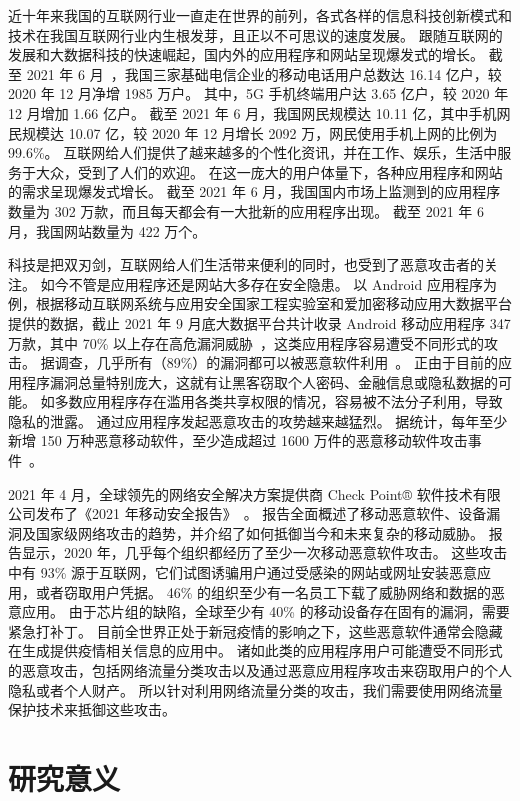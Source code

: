 \documentclass[degree=master,cjk-font=noto]{thuthesis}
\begin{document}
近十年来我国的互联网行业一直走在世界的前列，各式各样的信息科技创新模式和技术在我国互联网行业内生根发芽，且正以不可思议的速度发展。
跟随互联网的发展和大数据科技的快速崛起，国内外的应用程序和网站呈现爆发式的增长。
截至 2021 年 6 月~\cite{CNNIC-report}，我国三家基础电信企业的移动电话用户总数达 16.14 亿户，较 2020 年 12 月净增 1985 万户。
其中，5G 手机终端用户达 3.65 亿户，较 2020 年 12 月增加 1.66 亿户。
截至 2021 年 6 月，我国网民规模达 10.11 亿，其中手机网民规模达 10.07 亿，较 2020 年 12 月增长 2092 万，网民使用手机上网的比例为 99.6\%。
互联网给人们提供了越来越多的个性化资讯，并在工作、娱乐，生活中服务于大众，受到了人们的欢迎。
在这一庞大的用户体量下，各种应用程序和网站的需求呈现爆发式增长。
截至 2021 年 6 月，我国国内市场上监测到的应用程序数量为 302 万款，而且每天都会有一大批新的应用程序出现。
截至 2021 年 6 月，我国网站数量为 422 万个。

科技是把双刃剑，互联网给人们生活带来便利的同时，也受到了恶意攻击者的关注。
如今不管是应用程序还是网站大多存在安全隐患。
以 Android 应用程序为例，根据移动互联网系统与应用安全国家工程实验室和爱加密移动应用大数据平台提供的数据，截止 2021 年 9 月底大数据平台共计收录 Android 移动应用程序 347 万款，其中 70\% 以上存在高危漏洞威胁~\cite{App-report}，这类应用程序容易遭受不同形式的攻击。
据调查，几乎所有（89\%）的漏洞都可以被恶意软件利用~\cite{ZOL-report}。
正由于目前的应用程序漏洞总量特别庞大，这就有让黑客窃取个人密码、金融信息或隐私数据的可能。
如多数应用程序存在滥用各类共享权限的情况，容易被不法分子利用，导致隐私的泄露。
通过应用程序发起恶意攻击的攻势越来越猛烈。
据统计，每年至少新增 150 万种恶意移动软件，至少造成超过 1600 万件的恶意移动软件攻击事件~\cite{Attack-report}。

2021 年 4 月，全球领先的网络安全解决方案提供商 Check Point® 软件技术有限公司发布了《2021 年移动安全报告》~\cite{Attack2-report}。
报告全面概述了移动恶意软件、设备漏洞及国家级网络攻击的趋势，并介绍了如何抵御当今和未来复杂的移动威胁。
报告显示，2020 年，几乎每个组织都经历了至少一次移动恶意软件攻击。
这些攻击中有 93\% 源于互联网，它们试图诱骗用户通过受感染的网站或网址安装恶意应用，或者窃取用户凭据。
46\% 的组织至少有一名员工下载了威胁网络和数据的恶意应用。
由于芯片组的缺陷，全球至少有 40\% 的移动设备存在固有的漏洞，需要紧急打补丁。
目前全世界正处于新冠疫情的影响之下，这些恶意软件通常会隐藏在生成提供疫情相关信息的应用中。
诸如此类的应用程序用户可能遭受不同形式的恶意攻击，包括网络流量分类攻击以及通过恶意应用程序攻击来窃取用户的个人隐私或者个人财产。
所以针对利用网络流量分类的攻击，我们需要使用网络流量保护技术来抵御这些攻击。

\section{研究意义}
\end{document}
